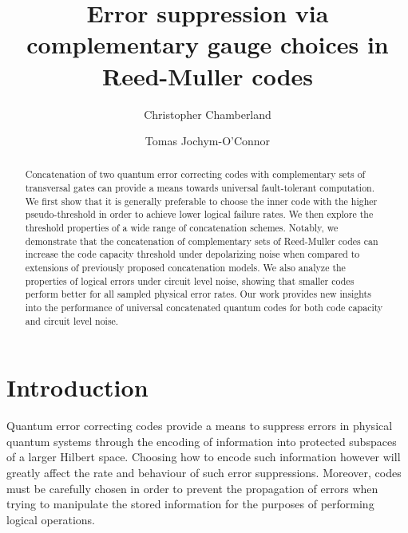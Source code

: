 \documentclass[pra,longbibliography,twocolumn,showpacs,nofootinbib,superscriptaddress,notitlepage]{revtex4-1}
\begin{document}
\title{Error suppression via complementary gauge choices in Reed-Muller codes}

\author{Christopher Chamberland}
\author{Tomas Jochym-O'Connor}

\begin{abstract}
Concatenation of two quantum error correcting codes with complementary sets of transversal gates can provide a means towards universal fault-tolerant computation. We first show that it is generally preferable to choose the inner code with the higher pseudo-threshold in order to achieve lower logical failure rates. We then explore the threshold properties of a wide range of concatenation schemes. Notably, we demonstrate that the concatenation of complementary sets of Reed-Muller codes can increase the code capacity threshold under depolarizing noise when compared to extensions of previously proposed concatenation models. We also analyze the properties of logical errors under circuit level noise, showing that smaller codes perform better for all sampled physical error rates. Our work provides new insights into the performance of universal concatenated quantum codes for both code capacity and circuit level noise. 
\end{abstract}


\maketitle

\section{Introduction}
\label{sec:Intro}


Quantum error correcting codes provide a means to suppress errors in physical quantum systems through the encoding of information into protected subspaces of a larger Hilbert space. Choosing how to encode such information however will greatly affect the rate and behaviour of such error suppressions. Moreover, codes must be carefully chosen in order to prevent the propagation of errors when trying to manipulate the stored information for the purposes of performing logical operations.
\end{document}
